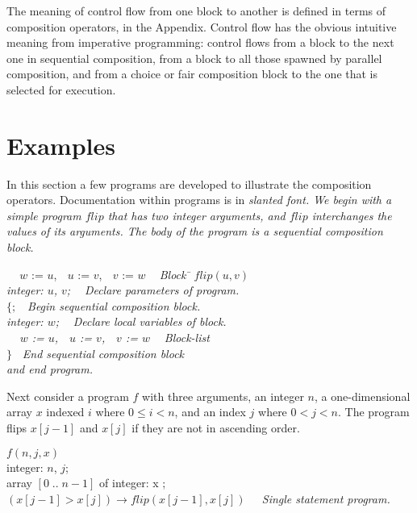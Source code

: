 The meaning of control flow from one block to another is defined
in terms of composition operators, in the Appendix.
Control flow has the obvious intuitive meaning from imperative programming:
control flows from a block to the next one in sequential composition,
from a block to all those spawned by parallel composition, and
from a choice or fair composition block to the one that is selected
for execution.
\section{Examples}
In this section a few programs are developed to illustrate the
composition operators.
Documentation within programs is in \sl slanted font. \rm
We begin with a simple program $flip$ that has two integer arguments,
and $flip$ interchanges the values of its arguments.
The body of the program is a sequential composition block.

\vspace{5mm}

\noindent
\begin{tabbing}
$\; \; \; $ $w$ := $u$, $\;$ $u$ := $v$,  $\;$ $v$ := $w$
$\; \;$ \sl Block \rm \=  \kill
$flip(u,v)$\\
integer: $u$, $v$; $\; \;$  \>\sl Declare parameters of program. \rm \\
$\{; \; \;$  \> \sl Begin sequential composition block. \rm \\
integer: $w$; $\; \;$  \> \sl Declare local variables  of block. \rm \\
$\; \; \; $ $w$ := $u$, $\;$ $u$ := $v$,  $\;$ $v$ := $w$
$\; \;$ \> \sl Block-list \rm \\
$\} \; \;$  \> \sl End sequential composition block \rm \\
               \> \sl and end program. \rm
\end{tabbing}


Next consider a program $f$ with three arguments, an integer $n$, a 
one-dimensional array $x$ indexed $i$ where $0 \leq i < n$, and an
index $j$ where  $0 < j < n$. 
The program flips $x[j-1]$ and $x[j]$ if they are not in ascending order.


\begin{tabbing}
$f(n,j,x)$ \\
integer: $n$, $j$; \\
array $[0 \; .. \; n-1]$ of integer: x ; \\
$(x[j-1] > x[j]) \rightarrow  flip(x[j-1],x[j]) \;\;\;\;$
\sl Single statement program. \rm \\
\end{tabbing}

